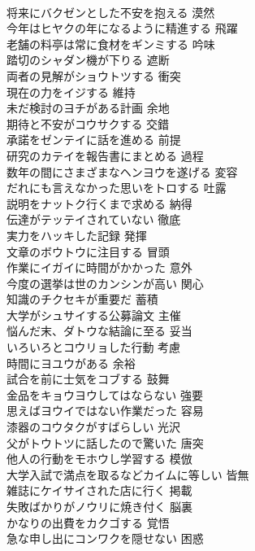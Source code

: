 \documentclass[8pt]{extreport}
\begin{document}
\begin{CJK}{UTF8}{min}
\\	将来にバクゼンとした不安を抱える	漠然
\\	今年はヒヤクの年になるように精進する	飛躍
\\	老舗の料亭は常に食材をギンミする	吟味
\\	踏切のシャダン機が下りる	遮断
\\	両者の見解がショウトツする	衝突
\\	現在の力をイジする	維持
\\	未だ検討のヨチがある計画	余地
\\	期待と不安がコウサクする	交錯
\\	承諾をゼンテイに話を進める	前提
\\	研究のカテイを報告書にまとめる	過程
\\	数年の間にさまざまなヘンヨウを遂げる	変容
\\	だれにも言えなかった思いをトロする	吐露
\\	説明をナットク行くまで求める	納得
\\	伝達がテッテイされていない	徹底
\\	実力をハッキした記録	発揮
\\	文章のボウトウに注目する	冒頭
\\	作業にイガイに時間がかかった	意外
\\	今度の選挙は世のカンシンが高い	関心
\\	知識のチクセキが重要だ	蓄積
\\	大学がシュサイする公募論文	主催
\\	悩んだ末、ダトウな結論に至る	妥当
\\	いろいろとコウリョした行動	考慮
\\	時間にヨユウがある	余裕
\\	試合を前に士気をコブする	鼓舞
\\	金品をキョウヨウしてはならない	強要
\\	思えばヨウイではない作業だった	容易
\\	漆器のコウタクがすばらしい	光沢
\\	父がトウトツに話したので驚いた	唐突
\\	他人の行動をモホウし学習する	模倣
\\	大学入試で満点を取るなどカイムに等しい	皆無
\\	雑誌にケイサイされた店に行く	掲載
\\	失敗ばかりがノウリに焼き付く	脳裏
\\	かなりの出費をカクゴする	覚悟
\\	急な申し出にコンワクを隠せない	困惑

\end{CJK}
\end{document}
